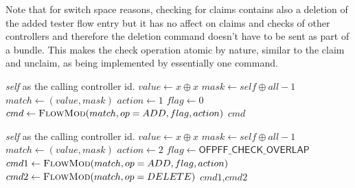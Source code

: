 \documentclass[conference]{sigcomm-alternate}
\newcommand{\concat}[0]{\oplus}
\newcommand{\claimcheck}{check\xspace}
\begin{document}
Note that for switch space reasons, checking for claims contains also a deletion of the added tester flow entry but it has no affect on claims and checks of other controllers and therefore the deletion command doesn't have to be sent as part of a bundle. This makes the \textsf{\claimcheck} operation atomic by nature, similar to the \textsf{claim} and \textsf{unclaim}, as being implemented by essentially one command.




\begin{algorithm}[H]
    \caption{$\textit{claim}(x)$}
    \label{alg:claim}
    \begin{algorithmic}[1]
    \Require \emph{self} as the calling controller id.
    		\State $value \gets x\concat x$
    		\State $mask \gets self\concat all-1$
	    	\State $match \gets (value,mask)$
    		\State $action \gets 1$
    		\State $flag \gets 0$
    		\State $cmd\gets \textsc{FlowMod}(match, op = ADD, flag, action) $
			\Return $cmd$
    \end{algorithmic}
\end{algorithm}

\begin{algorithm}[H]
    \caption{$\textit{\claimcheck}(x)$}
    \label{alg:check}
    \begin{algorithmic}[1]
    \Require \emph{self} as the calling controller id.
    		\State $value \gets x\concat x$
    		\State $mask \gets self\concat all-1$
    		\State $match \gets (value,mask)$
    		\State $action \gets 2$
    		\State $flag \gets \textsf{OFPFF\_CHECK\_OVERLAP}$
    		\State $cmd1\gets \textsc{FlowMod}(match, op = ADD, flag, action) $
    		\State $cmd2\gets \textsc{FlowMod}(match, op = DELETE) $
			\Return $cmd1$,$cmd2$
    \end{algorithmic}
\end{algorithm}
\end{document}
